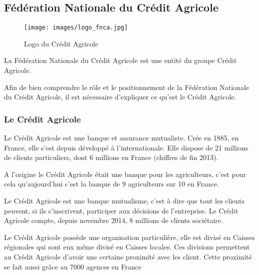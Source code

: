 \documentclass[12pt,a4paper]{article}
\begin{document}
\subsection{Fédération Nationale du Crédit Agricole}
\begin{figure}[h!]
\centering
\texttt{[image: images/logo\_fnca.jpg]}
\caption{Logo du Crédit Agricole}
\end{figure}
La Fédération Nationale du Crédit Agricole est une entité du groupe Crédit Agricole.\par
Afin de bien comprendre le rôle et le positionnement de la Fédération Nationale du Crédit Agricole, il est nécessaire d'expliquer ce qu'est le Crédit Agricole.
\subsubsection{Le Crédit Agricole}
Le Crédit Agricole est une banque et assurance mutualiste. Crée en 1885, en France, elle s'est depuis développé à l'internationale. Elle dispose de 21 millions de clients particuliers, dont 6 millions en France (chiffres de fin 2013).\par
A l'origine le Crédit Agricole était une banque pour les agriculteurs, c'est pour cela qu'aujourd'hui c'est la banque de 9 agriculteurs sur 10 en France.\par
Le Crédit Agricole est une banque mutualisme, c'est à dire que tout les clients peuvent, si ils s'inscrivent, participer aux décisions de l'entreprise. Le Crédit Agricole compte, depuis novembre 2014, 8 millions de clients sociétaire.\par 
Le Crédit Agricole possède une organisation particulière, elle est divisé en Caisses régionales qui sont eux même divisé en Caisses locales. Ces divisions permettent au Crédit Agricole d'avoir une certaine proximité avec les client. Cette proximité se fait aussi grâce au 7000 agences en France\par 
\end{document}
